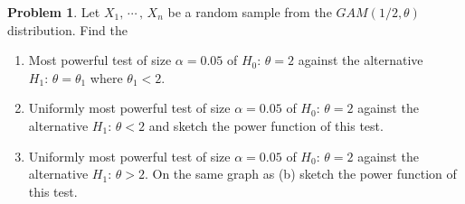 \documentclass[12pt,a4paper]{report}
\theoremstyle{definition}
\newtheorem{problemx}{Problem}[section]
\newenvironment{problem}{\begin{problemx}}{\end{problemx}}
\begin{document}
\begin{problem}
Let $X_1, \, \cdots\,, \, X_n$ be a random sample from the $GAM(1/2,\theta)$ distribution. Find the 
\begin{enumerate}
\item[(a)] Most powerful test of size $\alpha = 0.05$ of $H_0:\, \theta = 2$ against the alternative $H_1:\, \theta = \theta_1$ where $\theta_1 < 2$.
\item[(b)] Uniformly most powerful test of size $\alpha = 0.05$ of $H_0:\, \theta = 2$ against the alternative $H_1:\, \theta < 2$ and sketch the power function of this test.
\item[(c)] Uniformly most powerful test of size $\alpha = 0.05$ of $H_0:\, \theta = 2$ against the alternative $H_1:\, \theta > 2$. On the same graph as (b) sketch the power function of this test.
\end{enumerate}
\end{problem}
\end{document}

